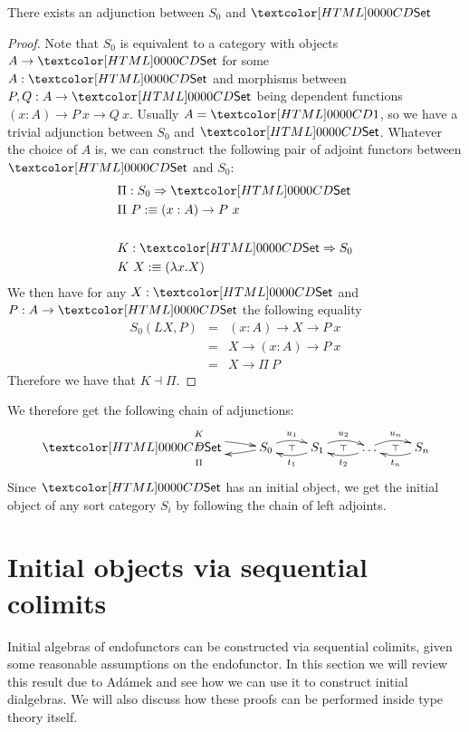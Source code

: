 \begin{proposition}
  There exists an adjunction between $S_0$ and $\Set$
\end{proposition}

\begin{proof}
  Note that $S_0$ is equivalent to a category with objects
  $A \to \Set$ for some $A : \Set$ and morphisms between
  $P, Q : A \to \Set$ being dependent functions
  $(x : A) \to P\ x \to Q\ x$. Usually $A = \unitty$, so we have a
  trivial adjunction between $S_0$ and $\Set$. Whatever the choice of
  $A$ is, we can construct the following pair of adjoint functors
  between $\Set$ and $S_0$:
  \begin{align*}
    &\Pi : \Func{S_0}{\Set} \\
    &\Pi\ P \ddefeq (x : A) \to P\ x \\
    \\
    &K : \Func{\Set}{S_0} \\
    &K\ X \ddefeq (\lambda x . X)
  \end{align*}
  We then have for any $X : \Set$ and $P : A \to \Set$ the following equality
  \begin{align*}
  S_0(LX , P) &=& (x : A) \to X \to P\ x \\
    &=& X \to (x : A) \to P\ x \\
    &=& X \to \Pi\ P
  \end{align*}
  Therefore we have that $K \dashv \Pi$.
\end{proof}

We therefore get the following chain of adjunctions:
$$
\xymatrix{
\Set \ar@/^/[r]^{K}
\ar@{}[r]|{\top} 
&S_0 \ar@/^/[l]^{\Pi} \ar@/^/[r]^{u_1} 
\ar@{}[r]|{\top} 
&S_1 \ar@/^/[l]^{t_1} \ar@/^/[r]^{u_2} 
\ar@{}[r]|{\top} 
&\hdots \ar@/^/[l]^{t_2} \ar@/^/[r]^{u_n} 
\ar@{}[r]|{\top} 
&S_n \ar@/^/[l]^{t_n}
}
$$
Since $\Set$ has an initial object, we get the initial object of any
sort category $S_i$ by following the chain of left adjoints.

\section{Initial objects via sequential colimits}
\label{sequential-colimits}

Initial algebras of endofunctors can be constructed via sequential
colimits, given some reasonable assumptions on the endofunctor. In
this section we will review this result due to Ad\'amek
\cite{Adamek1979} and see how we can use it to construct initial
dialgebras. We will also discuss how these proofs can be performed
inside type theory itself.

